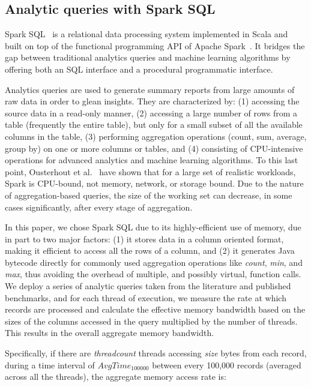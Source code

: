 \documentclass{sig-alternate-05-2015}
\begin{document}
\subsection{Analytic queries with Spark SQL}
\label{sec:sparksql}

Spark SQL~\cite{Armbrust:2015:SSR:2723372.2742797} is a relational data
processing system implemented in Scala and built on top of the functional
programming API of Apache Spark~\cite{Zaharia:2010:SCC:1863103.1863113}. It
bridges the gap between traditional analytics queries and machine
learning algorithms by offering both an SQL interface and a procedural
programmatic interface.

Analytics queries are used to generate summary reports from large amounts of
raw data in order to glean insights. They are characterized by: (1) accessing
the source data in a read-only manner, (2) accessing a large number of rows
from a table (frequently the entire table), but only for a small subset of all
the available columns in the table, (3) performing aggregation operations
(count, sum, average, group by) on one or more columns or tables, and (4)
consisting of CPU-intensive operations for advanced analytics and machine
learning algorithms.  To this last point, Ousterhout et
al.~\cite{Ousterhout:2015:MSP:2789770.2789791} have shown that for a large set
of realistic workloads, Spark is CPU-bound, not memory, network, or storage
bound.  Due to the nature of aggregation-based queries, the size of the working
set can decrease, in some cases significantly, after every stage of
aggregation.

In this paper, we chose Spark SQL due to its highly-efficient use of memory,
due in part to two major factors: (1) it stores data in a column oriented
format, making it efficient to access all the rows of a column, and (2) it
generates Java bytecode directly for commonly used aggregation operations like
{\em count}, {\em min}, and {\em max}, thus avoiding the overhead of multiple,
and possibly virtual, function calls.  We deploy a series of analytic queries
taken from the literature and published benchmarks, and for each thread of
execution, we measure the rate at which records are processed and calculate the
effective memory bandwidth based on the sizes of the columns accessed in the
query multiplied by the number of threads.  This results in the overall
aggregate memory bandwidth.

Specifically, if there are {\em threadcount} threads accessing {\em size} bytes
from each record, during a time interval of $AvgTime_{100000}$ between every
100,000 records (averaged across all the threads), the aggregate memory access
rate is:
\end{document}
